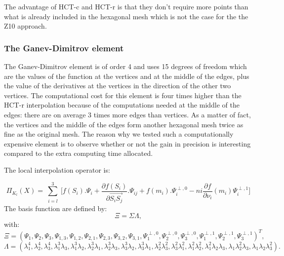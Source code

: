 \documentclass[proc]{edpsmath}
\begin{document}
The advantage of HCT-c and HCT-r is that they don't require more points than what is already included in the hexagonal mesh which is not the case for the the Z10 approach.

\subsubsection{The Ganev-Dimitrov element}
\label{subsubsec:ganevdimitrov}
The Ganev-Dimitrov element is of order 4 and uses 15 degrees of freedom which are the values of the function at the vertices and at the middle of the edges, plus the value of the derivatives at the vertices in the direction of the other two vertices. 
The computational cost for this element is four times higher than the HCT-r interpolation because of the computations needed at the middle of the edges: there are on average 3 times more edges than vertices. As a matter of fact, the vertices and the middle of the edges form another hexagonal mesh twice as fine as the original mesh. The reason why we tested such a computationally expensive element is to observe whether or not the gain in precision is interesting compared to the extra computing time allocated. 

\noindent The local interpolation operator is:

\begin{equation*}
 \Pi_{K_l} (X) = \sum \limits_{\substack{i=l }}^{3}{ [f(S_i).\Psi_i +  \frac{\partial f(S_i)}{\partial  \overrightarrow{ S_i S_j } }.\Psi_{ij} } + f(m_i).\Psi^{\perp,0}_i  - ni \frac{\partial f}{\partial \nu_i}(m_i) \Psi^{\perp,1}_i] 
\end{equation*}
\noindent The basis function are defined by: 
\begin{equation*}
\Xi =  \Sigma \Lambda,
\end{equation*} 
 \noindent with:\\
\begin{equation*}
\Xi=(\Psi_1, \Psi_2, \Psi_3, \Psi_{1,3},\Psi_{1,2},\Psi_{2,1},\Psi_{2,3} ,\Psi_{3,2},\Psi_{3,1},\Psi_1^{\perp,0} ,\Psi_2^{\perp,0},\Psi_3^{\perp,0},\Psi_1^{\perp,1},\Psi_2^{\perp,1},\Psi_3^{\perp,1})^T,
\end{equation*} 
\begin{equation*}
\Lambda = ( \lambda_1^4,\lambda_2^4,\lambda_3^4,\lambda_1^3\lambda_3,\lambda_1^3\lambda_2,\lambda_2^3\lambda_1,\lambda_2^3\lambda_3 ,\lambda_3^3\lambda_2,\lambda_3^3\lambda_1,\lambda_2^2\lambda_3^2,\lambda_3^2\lambda_1^2,\lambda_1^2\lambda_2^2,\lambda_1^2\lambda_2\lambda_3,\lambda_1\lambda_2^2\lambda_3,\lambda_1\lambda_2\lambda_3^2).
\end{equation*} 
  
\end{document}
